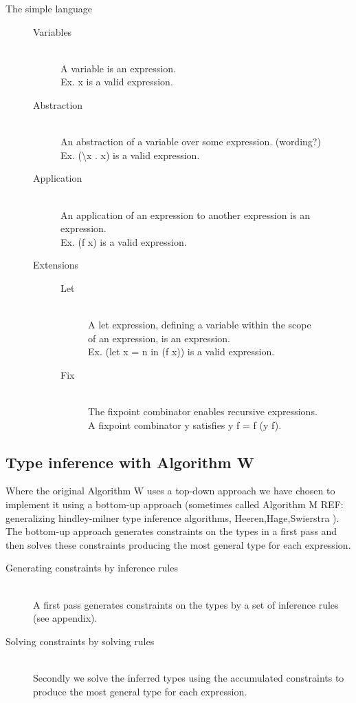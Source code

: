 \begin{description}
\item[The simple language] \hfill
\begin{description}
  \item[Variables] \hfill \\
    A variable is an expression.\\
    Ex. x is a valid expression.
   \item[Abstraction] \hfill \\
    An abstraction of a variable over some expression. (wording?)\\
    Ex. (\textbackslash x . x) is a valid expression.
   \item[Application] \hfill \\
    An application of an expression to another expression is an expression.\\
    Ex. (f x) is a valid expression.
   \item[Extensions] \hfill
\begin{description}
    \item[Let] \hfill \\
      A let expression, defining a variable within the scope\\
      of an expression, is an expression.\\
      Ex. (let x = n in (f x)) is a valid expression. 
    \item[Fix] \hfill \\
      The fixpoint combinator enables recursive expressions.\\
      A fixpoint combinator y satisfies y f = f (y f).
\end{description}
\end{description}
\end{description}

\subsection{Type inference with Algorithm W}

Where the original Algorithm W uses a top-down approach we have chosen to implement it using a bottom-up approach (sometimes called Algorithm M REF: generalizing hindley-milner type inference algorithms, Heeren,Hage,Swierstra ). The bottom-up approach generates constraints on the types in a first pass and then solves these constraints producing the most general type for each expression.

\begin{description}
  \item[Generating constraints by inference rules] \hfill \\
A first pass generates constraints on the types by a set of inference rules (see appendix). 
  \item[Solving constraints by solving rules] \hfill \\
Secondly we solve the inferred types using the accumulated constraints to produce the most general type for each expression. 
\end{description}
